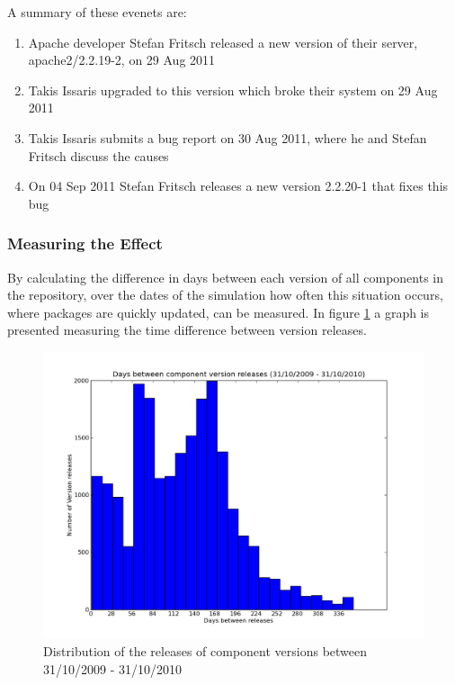 A summary of these evenets are:
\begin{enumerate}
  \item Apache developer Stefan Fritsch released a new version of their server, apache2/2.2.19-2, on 29 Aug 2011
  \item Takis Issaris upgraded to this version which broke their system on 29 Aug 2011
  \item Takis Issaris submits a bug report on 30 Aug 2011, where he and Stefan Fritsch discuss the causes
  \item On 04 Sep 2011 Stefan Fritsch releases a new version 2.2.20-1 that fixes this bug
\end{enumerate}



\subsubsection{Measuring the Effect}
By calculating the difference in days between each version of all components in the repository, 
over the dates of the simulation how often this situation occurs, where packages are quickly updated, can be measured.
In figure \ref{comeponentversionreleases} a graph is presented measuring the time difference between version releases.
 
\begin{figure}[htp]
\begin{center}
  \includegraphics[width=\textwidth]{ubuntusimulationpics/versionreleasedistribution}
  \caption[labelInTOC]{Distribution of the releases of component versions between 31/10/2009 - 31/10/2010}
  \label{comeponentversionreleases}
\end{center}
\end{figure}

